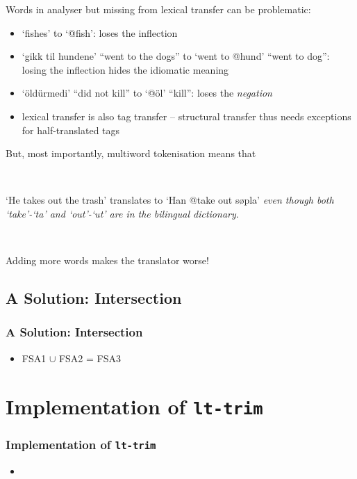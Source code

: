 \documentclass[notes=hide]{beamer}
\newcommand{\form}[1]{`#1'}
\newcommand{\tool}[1]{\texttt{#1}}
\begin{document}
\begin{frame}
  Words in analyser but missing from lexical transfer can be
  problematic:
  \begin{itemize}
  \item \form{fishes} to \form{@fish}: loses the inflection
  \item \form{gikk til hundene} ``went to the dogs'' to
    \form{went to @hund} ``went to dog'': losing the
    inflection hides the idiomatic meaning
  \item \form{öldürmedi} ``did not kill'' to \form{@öl} ``kill'':
    loses the \emph{negation}
  \item lexical transfer is also tag transfer – structural transfer
    thus needs exceptions for half-translated tags
  \end{itemize}
\end{frame}

\begin{frame}
  But, most importantly, multiword tokenisation means that

  ~

  \form{He takes out the trash} translates to \form{Han @take out
    søpla} \emph{even though both \form{take}-\form{ta} and
    \form{out}-\form{ut} are in the bilingual dictionary}.

  ~

  Adding more words makes the translator worse!
\end{frame}

\subsection{A Solution: Intersection}
\begin{frame}
  \frametitle{A Solution: Intersection}
  \begin{itemize}
  \item FSA1 $\cup$ FSA2 = FSA3
  \end{itemize}
\end{frame}

\section{Implementation of \tool{lt-trim}}
\begin{frame}
  \frametitle{Implementation of \tool{lt-trim}}
  \begin{itemize}
  \item
  \end{itemize}
\end{frame}
\end{document}
